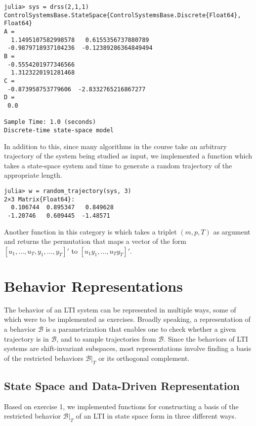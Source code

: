 \documentclass[11pt]{article}
\def\B{\mathscr{B}}
\begin{document}
\begin{codebox}
\begin{verbatim}
julia> sys = drss(2,1,1)
ControlSystemsBase.StateSpace{ControlSystemsBase.Discrete{Float64}, Float64}
A = 
  1.1495107582998578   0.6155356737880789
 -0.9879718937104236  -0.12389286364849494
B = 
 -0.5554201977346566
  1.3123220191281468
C = 
 -0.873958753779606  -2.8332765216867277
D = 
 0.0

Sample Time: 1.0 (seconds)
Discrete-time state-space model
\end{verbatim}
\end{codebox}

In addition to this, since many algorithms in the course take an arbitrary trajectory of the system being studied as input, we implemented a function  which takes a state-space system and time to generate a random trajectory of the appropriate length.

\begin{codebox}
\begin{verbatim}
julia> w = random_trajectory(sys, 3)
2×3 Matrix{Float64}:
  0.106744  0.895347   0.849628
 -1.20746   0.609445  -1.48571
\end{verbatim}
\end{codebox}

Another function in this category is  which takes a triplet $(m,p,T)$ as argument and returns the permutation that maps a vector of the form $[u_1, \dots, u_T, y_1, \dots, y_T]'$ to $[u_1 y_1, \dots, u_T y_T]'$.

\section{Behavior Representations}
The behavior of an LTI system can be represented in multiple ways, some of which were to be implemented as exercises. Broadly speaking, a representation of a behavior $\B$ is a parametrization that enables one to check whether a given trajectory is in $\B$, and to sample trajectories from $\B$. Since the behaviors of LTI systems are shift-invariant subspaces, most representations involve finding a basis of the restricted behaviors $\B|_T$ or its orthogonal complement.

\subsection*{State Space and Data-Driven Representation}
Based on exercise 1, we implemented functions for constructing a basis of the restricted behavior $\B|_T$ of an LTI in state space form in three different ways.
\end{document}

